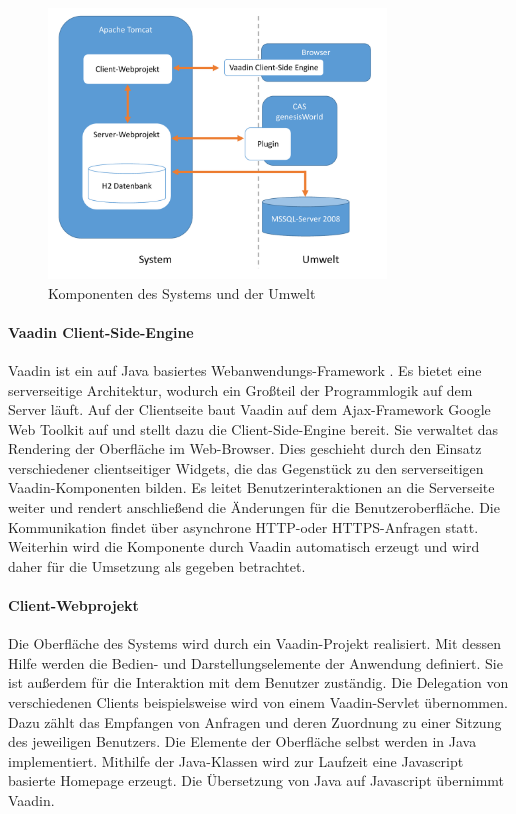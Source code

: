 \begin{figure}[htbp]
\centering
  \includegraphics[width=0.8\textwidth, width=0.8\textwidth]{pics/Konzept_architektur.pdf}
\caption{Komponenten des Systems und der Umwelt}
\label{konzept_architektur}
\end{figure} 

\paragraph{Vaadin Client-Side-Engine} Vaadin ist ein auf Java basiertes Webanwendungs-Framework \cite{vaadin2014}. Es bietet eine serverseitige Architektur, wodurch ein Großteil der Programmlogik auf dem Server läuft. Auf der Clientseite baut Vaadin auf dem Ajax-Framework Google Web Toolkit auf und stellt dazu die Client-Side-Engine bereit. Sie verwaltet das Rendering der Oberfläche im Web-Browser.  Dies geschieht durch den Einsatz verschiedener clientseitiger Widgets, die das Gegenstück zu den serverseitigen Vaadin-Komponenten bilden. Es leitet Benutzerinteraktionen an die Serverseite weiter und rendert anschließend die Änderungen für die Benutzeroberfläche. Die Kommunikation findet über asynchrone HTTP-oder HTTPS-Anfragen statt. Weiterhin wird die Komponente durch Vaadin automatisch erzeugt und wird daher für die Umsetzung als gegeben betrachtet.

\paragraph{Client-Webprojekt}

Die Oberfläche des Systems wird durch ein Vaadin-Projekt realisiert. Mit dessen Hilfe werden die Bedien- und Darstellungselemente der Anwendung definiert. Sie ist außerdem für die Interaktion mit dem Benutzer zuständig. Die Delegation von verschiedenen Clients beispielsweise wird von einem Vaadin-Servlet übernommen. Dazu zählt das Empfangen von Anfragen und deren Zuordnung zu einer Sitzung des jeweiligen Benutzers. Die Elemente der Oberfläche selbst werden in Java implementiert. Mithilfe der Java-Klassen wird zur Laufzeit eine Javascript basierte Homepage erzeugt. Die Übersetzung von Java auf Javascript übernimmt Vaadin.

